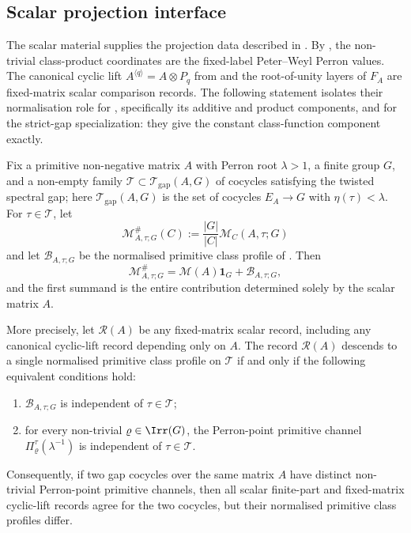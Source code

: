 \subsection{Scalar projection interface}

The scalar material supplies the projection data described in
.  By
, the non-trivial class-product
coordinates are the fixed-label Peter--Weyl Perron values.  The canonical cyclic lift
\(A^{\langle q\rangle}=A\otimes P_q\) from  and the
root-of-unity layers of \(F_A\) are fixed-matrix scalar comparison records.
The following statement isolates their normalisation role for
, specifically its additive
and product components, and for the strict-gap specialization: they give the
constant class-function component exactly.

\begin{theorem}
  \label{thm:finite-part-scalar-interface-no-descent}
  Fix a primitive non-negative matrix \(A\) with Perron root
  \(\lambda>1\), a finite group \(G\), and a non-empty family
  \(\mathscr T\subset\mathcal T_{\mathrm{gap}}(A,G)\) of cocycles
  satisfying the twisted spectral gap; here
  \(\mathcal T_{\mathrm{gap}}(A,G)\) is the set of cocycles
  \(E_A\to G\) with \(\eta(\tau)<\lambda\). For
  \(\tau\in\mathscr T\), let
  \[
    \mathcal M^\#_{A,\tau;G}(C):=\frac{|G|}{|C|}\mathcal M_C(A,\tau;G)
  \]
  and let \(\mathcal B_{A,\tau;G}\) be the normalised primitive class
  profile of . Then
  \begin{equation}\label{eq:finite-part-scalar-interface-splitting}
    \mathcal M^\#_{A,\tau;G}
    =
    \mathcal M(A)\mathbf 1_G+
    \mathcal B_{A,\tau;G},
  \end{equation}
  and the first summand is the entire contribution determined solely by
  the scalar matrix \(A\).

  More precisely, let \(\mathcal R(A)\) be any fixed-matrix scalar record,
  including any canonical cyclic-lift record depending only on \(A\).
  The record \(\mathcal R(A)\)
  descends to a single normalised primitive class profile on
  \(\mathscr T\) if and only if the following equivalent conditions hold:
  \begin{enumerate}[label=\textup{(\roman*)}]
    \item \(\mathcal B_{A,\tau;G}\) is independent of
      \(\tau\in\mathscr T\);
    \item for every non-trivial \(\varrho\in\Irr(G)\), the Perron-point
      primitive channel \(\Pi_\varrho^\tau(\lambda^{-1})\) is independent
      of \(\tau\in\mathscr T\).
  \end{enumerate}
  Consequently, if two gap cocycles over the same matrix \(A\) have
  distinct non-trivial Perron-point primitive channels, then all scalar
  finite-part and fixed-matrix cyclic-lift records agree for the two
  cocycles, but their normalised primitive class profiles differ.
\end{theorem}

